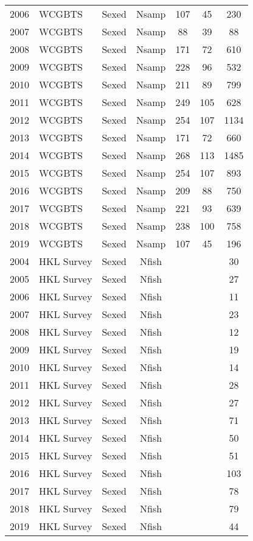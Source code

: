 \begin{longtable}[t]{c>{\centering\arraybackslash}p{3cm}ccccc}
2006 & WCGBTS & Sexed & Nsamp & 107 & 45 & 230\\
2007 & WCGBTS & Sexed & Nsamp & 88 & 39 & 88\\
2008 & WCGBTS & Sexed & Nsamp & 171 & 72 & 610\\
2009 & WCGBTS & Sexed & Nsamp & 228 & 96 & 532\\
2010 & WCGBTS & Sexed & Nsamp & 211 & 89 & 799\\
2011 & WCGBTS & Sexed & Nsamp & 249 & 105 & 628\\
2012 & WCGBTS & Sexed & Nsamp & 254 & 107 & 1134\\
2013 & WCGBTS & Sexed & Nsamp & 171 & 72 & 660\\
2014 & WCGBTS & Sexed & Nsamp & 268 & 113 & 1485\\
2015 & WCGBTS & Sexed & Nsamp & 254 & 107 & 893\\
2016 & WCGBTS & Sexed & Nsamp & 209 & 88 & 750\\
2017 & WCGBTS & Sexed & Nsamp & 221 & 93 & 639\\
2018 & WCGBTS & Sexed & Nsamp & 238 & 100 & 758\\
2019 & WCGBTS & Sexed & Nsamp & 107 & 45 & 196\\
2004 & HKL Survey & Sexed & Nfish &  &  & 30\\
2005 & HKL Survey & Sexed & Nfish &  &  & 27\\
2006 & HKL Survey & Sexed & Nfish &  &  & 11\\
2007 & HKL Survey & Sexed & Nfish &  &  & 23\\
2008 & HKL Survey & Sexed & Nfish &  &  & 12\\
2009 & HKL Survey & Sexed & Nfish &  &  & 19\\
2010 & HKL Survey & Sexed & Nfish &  &  & 14\\
2011 & HKL Survey & Sexed & Nfish &  &  & 28\\
2012 & HKL Survey & Sexed & Nfish &  &  & 27\\
2013 & HKL Survey & Sexed & Nfish &  &  & 71\\
2014 & HKL Survey & Sexed & Nfish &  &  & 50\\
2015 & HKL Survey & Sexed & Nfish &  &  & 51\\
2016 & HKL Survey & Sexed & Nfish &  &  & 103\\
2017 & HKL Survey & Sexed & Nfish &  &  & 78\\
2018 & HKL Survey & Sexed & Nfish &  &  & 79\\
2019 & HKL Survey & Sexed & Nfish &  &  & 44\\

\end{longtable}

